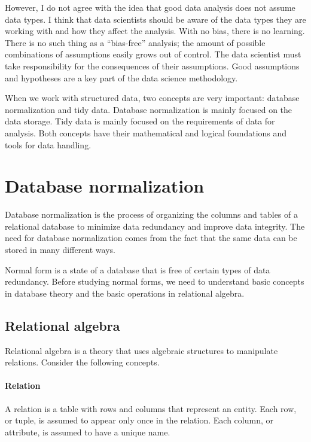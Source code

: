 However, I do not agree with the idea that good data analysis does not assume data types.
I think that data scientists should be aware of the data types they are working with and
how they affect the analysis.  With no bias, there is no learning.  There is no such
thing as a ``bias-free'' analysis; the amount of possible combinations of assumptions
easily grows out of control.  The data scientist must take responsibility for the
consequences of their assumptions.  Good assumptions and hypotheses are a key part of the
data science methodology.

When we work with structured data, two concepts are very important: database normalization
and tidy data.  Database normalization is mainly focused on the data storage.  Tidy data is
mainly focused on the requirements of data for analysis.  Both concepts have their
mathematical and logical foundations and tools for data handling.

\section{Database normalization}
\label{sec:normalization}

Database normalization is the process of organizing the columns and tables of a relational
database to minimize data redundancy and improve data integrity.  The need for database
normalization comes from the fact that the same data can be stored in many different ways.

Normal form is a state of a database that is free of certain types of data redundancy.
Before studying normal forms, we need to understand basic concepts in database theory
and the basic operations in relational algebra.

\subsection{Relational algebra}

Relational algebra is a theory that uses algebraic structures to manipulate relations.
Consider the following concepts.

\paragraph{Relation}  A relation is a table with rows and columns that represent
an entity.  Each row, or tuple, is assumed to appear only once in the relation.  Each
column, or attribute, is assumed to have a unique name.

